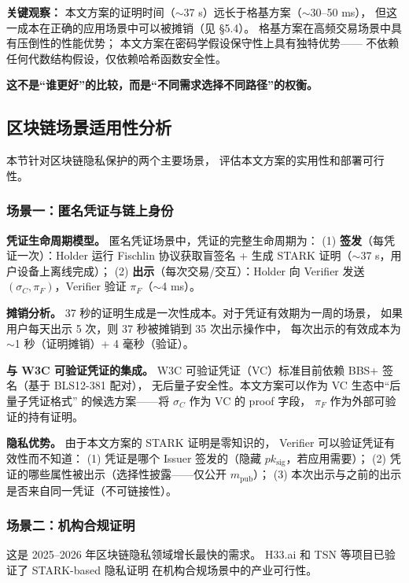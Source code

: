 \documentclass[11pt,a4paper]{ctexart}
\begin{document}
\textbf{关键观察：}
本文方案的证明时间（$\sim$37 s）远长于格基方案（$\sim$30--50 ms），
但这一成本在正确的应用场景中可以被摊销（见 §5.4）。
格基方案在高频交易场景中具有压倒性的性能优势；
本文方案在密码学假设保守性上具有独特优势——
不依赖任何代数结构假设，仅依赖哈希函数安全性。

\textbf{这不是``谁更好''的比较，而是``不同需求选择不同路径''的权衡。}

\subsection{区块链场景适用性分析}

本节针对区块链隐私保护的两个主要场景，
评估本文方案的实用性和部署可行性。

\subsubsection{场景一：匿名凭证与链上身份}

\textbf{凭证生命周期模型。}
匿名凭证场景中，凭证的完整生命周期为：
(1) \textbf{签发}（每凭证一次）：Holder 运行 Fischlin 协议获取盲签名 +
生成 STARK 证明（$\sim$37 s，用户设备上离线完成）；
(2) \textbf{出示}（每次交易/交互）：Holder 向 Verifier 发送
$(\sigma_C, \pi_F)$，Verifier 验证 $\pi_F$（$\sim$4 ms）。

\textbf{摊销分析。}
37 秒的证明生成是一次性成本。对于凭证有效期为一周的场景，
如果用户每天出示 5 次，则 37 秒被摊销到 35 次出示操作中，
每次出示的有效成本为 $\sim$1 秒（证明摊销）+ 4 毫秒（验证）。

\textbf{与 W3C 可验证凭证的集成。}
W3C 可验证凭证（VC）标准目前依赖 BBS+ 签名（基于 BLS12-381 配对），
无后量子安全性。本文方案可以作为 VC 生态中``后量子凭证格式''
的候选方案——将 $\sigma_C$ 作为 VC 的 proof 字段，
$\pi_F$ 作为外部可验证的持有证明。

\textbf{隐私优势。}
由于本文方案的 STARK 证明是零知识的，
Verifier 可以验证凭证有效性而不知道：
(1) 凭证是哪个 Issuer 签发的（隐藏 $pk_{\mathrm{sig}}$，若应用需要）；
(2) 凭证的哪些属性被出示（选择性披露——仅公开 $m_{\mathrm{pub}}$）；
(3) 本次出示与之前的出示是否来自同一凭证（不可链接性）。

\subsubsection{场景二：机构合规证明}

这是 2025--2026 年区块链隐私领域增长最快的需求。
H33.ai 和 TSN 等项目已验证了 STARK-based 隐私证明
在机构合规场景中的产业可行性。
\end{document}
